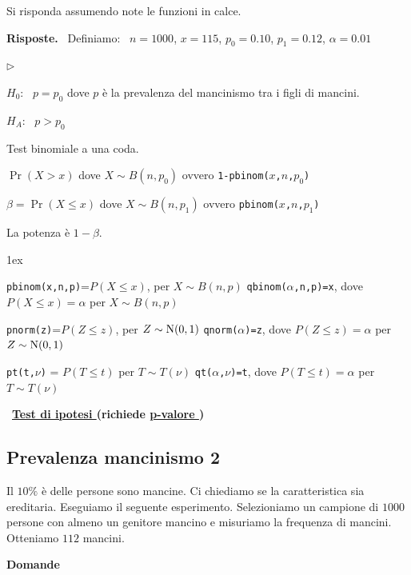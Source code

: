 \documentclass[11pt,openany]{book}
\newcommand{\mylabel}[1]{{\footnotesize\textsf{#1}}\hfill}
\renewenvironment{itemize}
  {\begin{list}{$\triangleright$}{%
   \setlength{\parskip}{0mm}
   \setlength{\topsep}{.2\baselineskip}
   \setlength{\rightmargin}{0mm}
   \setlength{\listparindent}{0mm}
   \setlength{\itemindent}{0mm}
   \setlength{\labelwidth}{3ex}
   \setlength{\itemsep}{.4\baselineskip}
   \setlength{\parsep}{0mm}
   \setlength{\partopsep}{0mm}
   \setlength{\labelsep}{1ex}
   \setlength{\leftmargin}{\labelwidth+\labelsep}
   \let\makelabel\mylabel}}{%
   \end{list}\vspace*{-1.3mm}}
\begin{document}
Si risponda assumendo note le funzioni in calce.

\textbf{Risposte.} \ Definiamo: \ $n=1000$,\hfil
$x=115$,\hfil
$p_0=0.10$,\hfil
$p_1=0.12$,\hfil
$\alpha=0.01$\hfil

\begin{itemize}
\item[1.] $H_0$: \ $p=p_0$ dove $p$ è la prevalenza del mancinismo tra i figli di mancini.
\item[2.] $H_A$: \ $p>p_0$ 
\item[3.] Test binomiale a una coda.
\item[4.] $\Pr(X> x)$ dove $X\sim B(n,p_0)$ ovvero {\tt 1-pbinom($x$,$n$,$p_0$)}
\item[5.] $\beta=\Pr(X\le x)$ dove $X\sim B(n,p_1)$ ovvero {\tt pbinom($x$,$n$,$p_1$)}
\item[6.]  La potenza è $1-\beta$.
\end{itemize}


\vfill
\parskip1ex
{\hrulefill\scriptsize

{\tt pbinom(x,n,p)}=$P(X\le x)$, per $X\sim B(n,p)$
\hfill 
{\tt qbinom($\alpha$,n,p)=x},  dove $P(X\le x)=\alpha$ per $X\sim B(n,p)$

{\tt pnorm(z)}=$P(Z\le z)$, per $Z\sim {\rm N}(0,1)$
\hfill 
{\tt qnorm($\alpha$)=z},  dove $P(Z\le z)=\alpha$ per $Z\sim {\rm N}(0,1)$

{\tt pt(t,$\nu$)} = $P(T\le t)$ per $T\sim T(\nu)$
\hfill
{\tt qt($\alpha$,$\nu$)=t}, dove $P(T\le t)=\alpha$ per $T\sim T(\nu)$

}

\clearpage\
\hfill\textbf{{\color{brown}\hyperref[test_ipotesi]{Test di ipotesi \faShare}} (richiede \hyperref[pvalore]{p-valore \faShare})} 
\subsection{Prevalenza mancinismo 2}
\label{Prevalenza mancinismo 2}

Il $10\%$ è delle persone sono mancine. Ci chiediamo se la caratteristica sia ereditaria. Eseguiamo il seguente esperimento. Selezioniamo un campione di $1000$ persone con almeno un genitore mancino e misuriamo la frequenza di mancini. Otteniamo $112$ mancini. 

\textbf{Domande}
\end{document}
